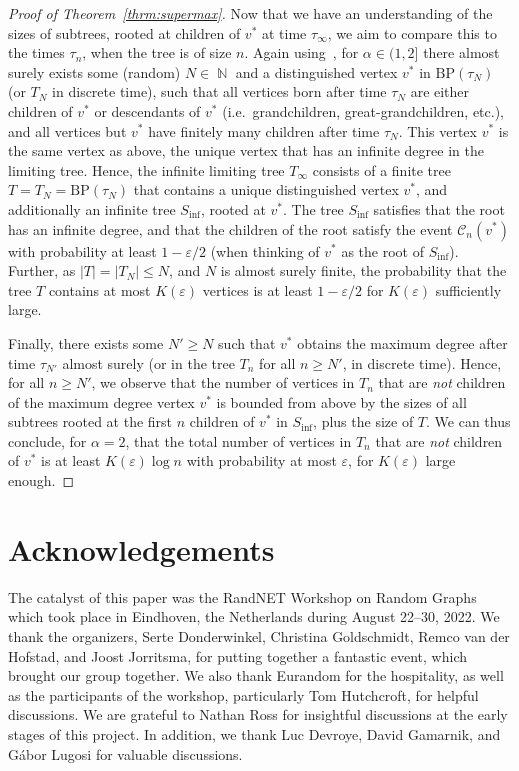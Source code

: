 \documentclass[11pt]{article}
\numberwithin{equation}{section}
\DeclareMathOperator{\N}{\mathbb{N}} %
\newcommand{\eps}{\varepsilon} %
\newcommand{\bp}{\mathrm{BP}}
\def\cC{{\mathcal C}}
\theoremstyle{definition}
\begin{document}
\begin{proof}[Proof of Theorem~\ref{thrm:supermax}]
    Now that we have an understanding of the sizes of subtrees, rooted at children of $v^*$ at time $\tau_\infty$, we aim to compare this to the times $\tau_n$, when the tree is of size $n$. Again using~\cite[Theorem~1.2]{oliveira2005connectivity}, for $\alpha\in(1, 2]$  there almost surely exists some (random) $N\in \N$ and a distinguished vertex $v^*$ in $\bp(\tau_N)$ (or $T_N$ in discrete time), such that all vertices born after time $\tau_N$ are either children of $v^*$ or descendants of $v^*$ (i.e.\ grandchildren, great-grandchildren, etc.), and all vertices but $v^*$ have finitely many children after time $\tau_N$. This vertex $v^*$ is the same vertex as above, the unique vertex that has an infinite degree in the limiting tree. Hence, the infinite limiting tree $T_\infty$ consists of a finite tree $T=T_N=\bp(\tau_N)$ that contains a unique distinguished vertex $v^*$, and additionally an infinite tree $S_{\text{inf}}$, rooted at $v^*$. The tree $S_{\inf}$ satisfies that the root has an infinite degree, and that the children of the root satisfy the event $\cC_n(v^*)$ with probability at least $1-\eps/2$ (when thinking of $v^*$ as the root of $S_{\text{inf}}$). Further, as $|T|=|T_N|\leq N$, and $N$ is almost surely finite, the probability that the tree $T$ contains at most  $K(\eps)$ vertices is at least $1-\eps/2$ for $K(\eps)$ sufficiently large.
    
    Finally, there exists some $N'\geq N$ such that $v^*$ obtains the maximum degree after time $\tau_{N'}$ almost surely (or in the tree $T_n$ for all $n\geq N'$, in discrete time). Hence, for all $n\geq N'$, we observe that the number of vertices in $T_n$ that are \emph{not} children of the maximum degree vertex $v^*$ is bounded from above by the sizes of all subtrees rooted at the first $n$ children of $v^*$ in $S_{\text{inf}}$, plus the size of $T$. We can thus conclude, for $\alpha=2$, that the total number of vertices in $T_n$ that are \emph{not} children of $v^*$ is   at least $K(\eps)\log n$ with probability at most $\eps$, for $K(\eps)$ large enough. 
\end{proof}



\section*{Acknowledgements}

The catalyst of this paper was the RandNET Workshop on Random Graphs which took place in Eindhoven, the Netherlands during August 22--30, 2022. We thank the organizers, Serte Donderwinkel, Christina Goldschmidt, Remco van der Hofstad, and Joost Jorritsma, for putting together a fantastic event, which brought our group together. We also thank Eurandom for the hospitality, as well as the participants of the workshop, particularly Tom Hutchcroft, for helpful discussions. We are grateful to Nathan Ross for insightful discussions at the early stages of this project. In addition, we thank Luc Devroye, David Gamarnik, and G\'abor Lugosi for valuable discussions. 
\end{document}
